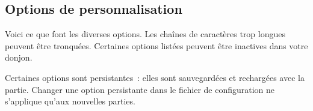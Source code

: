 \documentclass[titlepage]{article}
\begin{document}
\subsection{Options de personnalisation}



Voici ce que font les diverses options.
Les chaînes de caractères trop longues peuvent être tronquées.
Certaines options listées peuvent être inactives dans votre donjon.


Certaines options sont persistantes~: elles sont sauvegardées et
rechargées avec la partie.
Changer une option persistante dans le fichier de configuration ne
s'applique qu'aux nouvelles parties.
\end{document}
